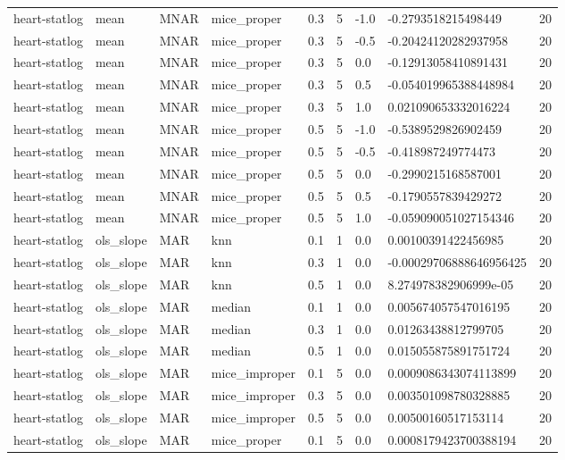 \begin{tabular}{lllllllll}
heart-statlog & mean & MNAR & mice\_proper & 0.3 & 5 & -1.0 & -0.2793518215498449 & 20 \\
heart-statlog & mean & MNAR & mice\_proper & 0.3 & 5 & -0.5 & -0.20424120282937958 & 20 \\
heart-statlog & mean & MNAR & mice\_proper & 0.3 & 5 & 0.0 & -0.12913058410891431 & 20 \\
heart-statlog & mean & MNAR & mice\_proper & 0.3 & 5 & 0.5 & -0.054019965388448984 & 20 \\
heart-statlog & mean & MNAR & mice\_proper & 0.3 & 5 & 1.0 & 0.021090653332016224 & 20 \\
heart-statlog & mean & MNAR & mice\_proper & 0.5 & 5 & -1.0 & -0.5389529826902459 & 20 \\
heart-statlog & mean & MNAR & mice\_proper & 0.5 & 5 & -0.5 & -0.418987249774473 & 20 \\
heart-statlog & mean & MNAR & mice\_proper & 0.5 & 5 & 0.0 & -0.2990215168587001 & 20 \\
heart-statlog & mean & MNAR & mice\_proper & 0.5 & 5 & 0.5 & -0.1790557839429272 & 20 \\
heart-statlog & mean & MNAR & mice\_proper & 0.5 & 5 & 1.0 & -0.059090051027154346 & 20 \\
heart-statlog & ols\_slope & MAR & knn & 0.1 & 1 & 0.0 & 0.00100391422456985 & 20 \\
heart-statlog & ols\_slope & MAR & knn & 0.3 & 1 & 0.0 & -0.00029706888646956425 & 20 \\
heart-statlog & ols\_slope & MAR & knn & 0.5 & 1 & 0.0 & 8.274978382906999e-05 & 20 \\
heart-statlog & ols\_slope & MAR & median & 0.1 & 1 & 0.0 & 0.005674057547016195 & 20 \\
heart-statlog & ols\_slope & MAR & median & 0.3 & 1 & 0.0 & 0.01263438812799705 & 20 \\
heart-statlog & ols\_slope & MAR & median & 0.5 & 1 & 0.0 & 0.015055875891751724 & 20 \\
heart-statlog & ols\_slope & MAR & mice\_improper & 0.1 & 5 & 0.0 & 0.0009086343074113899 & 20 \\
heart-statlog & ols\_slope & MAR & mice\_improper & 0.3 & 5 & 0.0 & 0.003501098780328885 & 20 \\
heart-statlog & ols\_slope & MAR & mice\_improper & 0.5 & 5 & 0.0 & 0.00500160517153114 & 20 \\
heart-statlog & ols\_slope & MAR & mice\_proper & 0.1 & 5 & 0.0 & 0.0008179423700388194 & 20 \\

\end{tabular}

